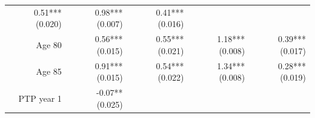 \documentclass[]{article}
\begin{document}
\begin{longtable}[c]{@{}rrrrr@{}}
\begin{minipage}[t]{0.16\columnwidth}
0.51*** (0.020)
\strut\end{minipage} &
\begin{minipage}[t]{0.18\columnwidth}\raggedleft\strut
0.98*** (0.007)
\strut\end{minipage} &
\begin{minipage}[t]{0.15\columnwidth}\raggedleft\strut
0.41*** (0.016)
\strut\end{minipage}\tabularnewline
\begin{minipage}[t]{0.17\columnwidth}\raggedleft\strut
Age 80
\strut\end{minipage} &
\begin{minipage}[t]{0.20\columnwidth}\raggedleft\strut
0.56*** (0.015)
\strut\end{minipage} &
\begin{minipage}[t]{0.16\columnwidth}\raggedleft\strut
0.55*** (0.021)
\strut\end{minipage} &
\begin{minipage}[t]{0.18\columnwidth}\raggedleft\strut
1.18*** (0.008)
\strut\end{minipage} &
\begin{minipage}[t]{0.15\columnwidth}\raggedleft\strut
0.39*** (0.017)
\strut\end{minipage}\tabularnewline
\begin{minipage}[t]{0.17\columnwidth}\raggedleft\strut
Age 85
\strut\end{minipage} &
\begin{minipage}[t]{0.20\columnwidth}\raggedleft\strut
0.91*** (0.015)
\strut\end{minipage} &
\begin{minipage}[t]{0.16\columnwidth}\raggedleft\strut
0.54*** (0.022)
\strut\end{minipage} &
\begin{minipage}[t]{0.18\columnwidth}\raggedleft\strut
1.34*** (0.008)
\strut\end{minipage} &
\begin{minipage}[t]{0.15\columnwidth}\raggedleft\strut
0.28*** (0.019)
\strut\end{minipage}\tabularnewline
\begin{minipage}[t]{0.17\columnwidth}\raggedleft\strut
PTP year 1
\strut\end{minipage} &
\begin{minipage}[t]{0.20\columnwidth}\raggedleft\strut
-0.07** (0.025)
\strut\end{minipage} &
\begin{minipage}[t]{0.16\columnwidth}\raggedleft\strut

\end{minipage}
\end{longtable}
\end{document}
